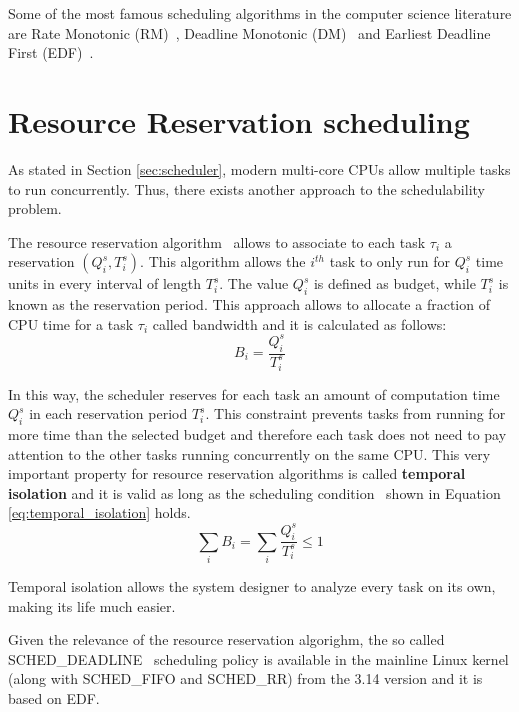 Some of the most famous scheduling algorithms in the computer science literature
are Rate Monotonic (RM)~\cite{lehoczky1989rate}, Deadline Monotonic
(DM)~\cite{audsley1991hard} and Earliest Deadline First (EDF)~\cite{jansen2003lightweight}.


\section{Resource Reservation scheduling}
As stated in Section \ref{sec:scheduler}, modern multi-core CPUs allow multiple
tasks to run concurrently. Thus, there exists another approach to the schedulability
problem.

The resource reservation algorithm~\cite{abeni1998integrating} allows to associate to each task 
\( \tau_{i} \) a reservation \( \left(Q_{i}^s, T_{i}^s\right) \). 
This algorithm allows the \( i^{th} \) task to only run for \( Q_{i}^s \) time units 
in every interval of length \( T_{i}^s \). The value \( Q_{i}^s \) is defined as
budget, while \( T_{i}^s \) is known as the reservation period.
This approach allows to allocate a fraction of CPU time for a task \( \tau_{i} \)
called bandwidth and it is calculated as follows:
\begin{equation}
    B_{i} = \frac{Q_{i}^s}{T_{i}^s}
\end{equation}

In this way, the scheduler reserves for each task an amount of computation
time \( Q_{i}^s \) in each reservation period \( T_{i}^s \). This constraint
prevents tasks from running for more time than the selected budget and
therefore each task does not need to pay attention to the other tasks running
concurrently on the same CPU. This very important property for resource reservation algorithms is called
\textbf{temporal isolation} and it is valid as long as the scheduling
condition~\cite{lee2007handbook} shown in Equation \ref{eq:temporal_isolation} 
holds.
\begin{equation} \label{eq:temporal_isolation}
    \displaystyle\sum_{i} B_{i} =  \displaystyle\sum_{i} \frac{Q_{i}^s}{T_{i}^s} \leq 1
\end{equation}

Temporal isolation allows the system designer to analyze every
task on its own, making its life much easier.

Given the relevance of the resource reservation algorighm, the so called
SCHED\_DEADLINE~\cite{lelli2016deadline} scheduling policy is available
in the mainline Linux kernel (along with SCHED\_FIFO and SCHED\_RR) from the
3.14 version and it is based on EDF.


